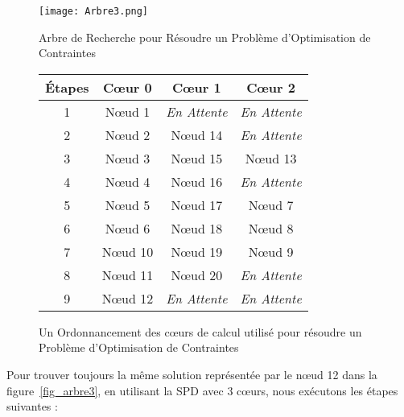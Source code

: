 \documentclass[parallelisme]{compas2014}
\begin{document}
\begin{figure}[htbp]
\begin{minipage}[c]{.5\linewidth}
\center \texttt{[image: Arbre3.png]}
\caption{Arbre de Recherche pour Résoudre un Problème d'Optimisation de Contraintes}
\label{fig_arbre3}
\end{minipage}
\hfill
\begin{minipage}[c]{.45\linewidth}
\small
 \center \begin{tabular}{|c|c|c|c|}
        \hline
        Étapes & Cœur 0 & Cœur 1 & Cœur 2\\ \hline
        1 & Nœud 1 & \textit{En Attente} & \textit{En Attente} \\ \hline
        2 & Nœud 2 & Nœud 14 & \textit{En Attente} \\ \hline
        3 & Nœud 3 & Nœud 15 & Nœud 13 \\ \hline
        4 & Nœud 4 & Nœud 16 & \textit{En Attente} \\ \hline
        5 & Nœud 5 & Nœud 17 & Nœud 7 \\ \hline 
        6 & Nœud 6 & Nœud 18 & Nœud 8 \\ \hline                                                 
        7 & Nœud 10 & Nœud 19 & Nœud 9\\ \hline
        8 & Nœud 11 & Nœud 20 & \textit{En Attente}\\ \hline
        9 & Nœud 12 & \textit{En Attente} & \textit{En Attente}\\ \hline
        \end{tabular}
        \caption{Un Ordonnancement des cœurs de calcul utilisé pour résoudre un Problème d'Optimisation de Contraintes}        
         \label{table_2}     

\end{minipage}
\end{figure}

Pour trouver toujours la même solution représentée par le nœud 12 dans la figure~\ref{fig_arbre3}, en utilisant la SPD avec 3 cœurs, nous exécutons les étapes suivantes :
\end{document}
